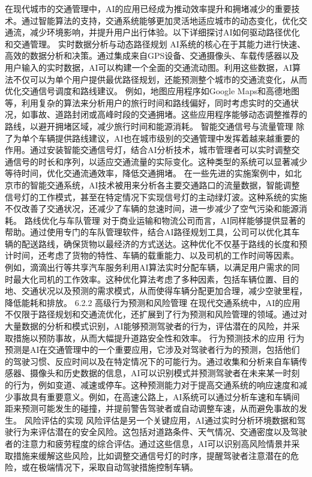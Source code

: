 在现代城市的交通管理中，AI的应用已经成为推动效率提升和拥堵减少的重要技术。通过智能算法的支持，交通系统能够更加灵活地适应城市的动态变化，优化交通流，减少环境影响，并提升用户出行体验。以下详细探讨AI如何驱动路径优化和交通管理。
实时数据分析与动态路径规划
AI系统的核心在于其能力进行快速、高效的数据分析和决策。通过集成来自GPS设备、交通摄像头、车载传感器以及用户输入的实时数据，AI可以构建一个全面的交通流动图。利用这些数据，AI算法不仅可以为单个用户提供最优路径规划，还能预测整个城市的交通流变化，从而优化交通信号调度和路线建议。
例如，地图应用程序如Google Maps和高德地图等，利用复杂的算法来分析用户的旅行时间和路线偏好，同时考虑实时的交通状况，如事故、道路封闭或高峰时段的交通拥堵。这些应用程序能够动态调整推荐的路线，以避开拥堵区域，减少旅行时间和能源消耗。
智能交通信号与流量管理
除了为单个车辆提供路线建议，AI也在城市级别的交通管理中发挥着越来越重要的作用。通过安装智能交通信号灯，结合AI分析技术，城市管理者可以实时调整交通信号的时长和序列，以适应交通流量的实际变化。这种类型的系统可以显著减少等待时间，优化交通流通效率，降低交通拥堵。
在一些先进的实施案例中，如北京市的智能交通系统，AI技术被用来分析各主要交通路口的流量数据，智能调整信号灯的工作模式，甚至在特定情况下实现信号灯的主动绿灯波。这种系统的实施不仅改善了交通状况，还减少了车辆的怠速时间，进一步减少了空气污染和能源消耗。
路线优化与车队管理
对于商业运输和物流公司而言，AI同样能够提供显著的帮助。通过使用专门的车队管理软件，结合AI路径规划工具，公司可以优化其车辆的配送路线，确保货物以最经济的方式送达。这种优化不仅基于路线的长度和预计时间，还考虑了货物的特性、车辆的载重能力、以及司机的工作时间等因素。
例如，滴滴出行等共享汽车服务利用AI算法实时分配车辆，以满足用户需求的同时最大化司机的工作效率。这种优化算法考虑了多种因素，包括车辆位置、目的地、交通状况以及预测的需求模式，从而使得车辆分配更加合理，减少空驶里程，降低能耗和排放。
6.2.2 高级行为预测和风险管理
在现代交通系统中，AI的应用不仅限于路径规划和交通流优化，还扩展到了行为预测和风险管理的领域。通过对大量数据的分析和模式识别，AI能够预测驾驶者的行为，评估潜在的风险，并采取措施以预防事故，从而大幅提升道路安全性和效率。
行为预测技术的应用
行为预测是AI在交通管理中的一个重要应用，它涉及对驾驶者行为的预测，包括他们的驾驶习惯、反应时间以及在特定情况下的可能行为。通过收集和分析来自车辆传感器、摄像头和历史数据的信息，AI可以识别模式并预测驾驶者在未来某一时刻的行为，例如变道、减速或停车。这种预测能力对于提高交通系统的响应速度和减少事故具有重要意义。例如，在高速公路上，AI系统可以通过分析车速和车辆间距来预测可能发生的碰撞，并提前警告驾驶者或自动调整车速，从而避免事故的发生。
风险评估的实现
风险评估是另一个关键应用，AI通过实时分析环境数据和驾驶行为来评估潜在的安全风险。这包括对道路条件、天气情况、交通密度以及驾驶者的注意力和疲劳程度的综合评估。通过这些信息，AI可以识别高风险情景并采取措施来缓解这些风险，比如调整交通信号灯的时序，提醒驾驶者注意潜在的危险，或在极端情况下，采取自动驾驶措施控制车辆。
